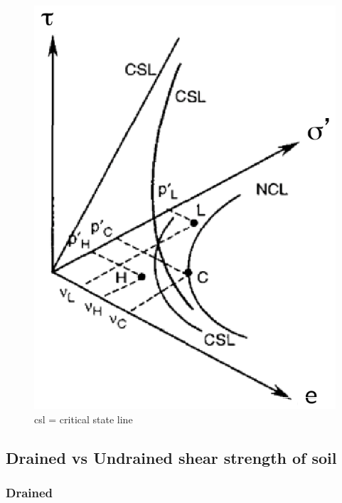     \begin{figure}[h!]
    \center
    \includegraphics[scale=0.5]{Verastegui/images/V10.PNG}
    \caption{csl = critical state line}
    \end{figure}
    
    \subsection{Drained vs Undrained shear strength of soil}
        \subsubsection{Drained}
        
